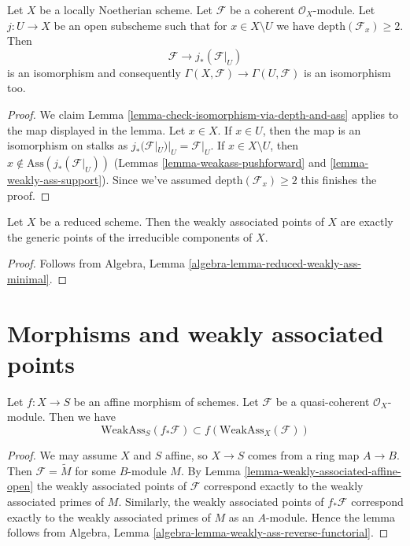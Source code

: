 \begin{lemma}
\label{lemma-depth-2-hartog}
Let $X$ be a locally Noetherian scheme. Let $\mathcal{F}$
be a coherent $\mathcal{O}_X$-module. Let $j : U \to X$
be an open subscheme such that for $x \in X \setminus U$
we have $\text{depth}(\mathcal{F}_x) \geq 2$. Then
$$
\mathcal{F} \longrightarrow j_*(\mathcal{F}|_U)
$$
is an isomorphism and consequently
$\Gamma(X, \mathcal{F}) \to \Gamma(U, \mathcal{F})$
is an isomorphism too.
\end{lemma}

\begin{proof}
We claim Lemma \ref{lemma-check-isomorphism-via-depth-and-ass}
applies to the map displayed in the lemma.
Let $x \in X$. If $x \in U$, then the map is an
isomorphism on stalks as $j_*(\mathcal{F}|_U)|_U = \mathcal{F}|_U$.
If $x \in X \setminus U$, then $x \not \in \text{Ass}(j_*(\mathcal{F}|_U))$
(Lemmas \ref{lemma-weakass-pushforward} and \ref{lemma-weakly-ass-support}).
Since we've assumed $\text{depth}(\mathcal{F}_x) \geq 2$
this finishes the proof.
\end{proof}

\begin{lemma}
\label{lemma-weakass-reduced}
Let $X$ be a reduced scheme. Then the weakly associated points of $X$
are exactly the generic points of the irreducible components of $X$.
\end{lemma}

\begin{proof}
Follows from Algebra, Lemma \ref{algebra-lemma-reduced-weakly-ass-minimal}.
\end{proof}



\section{Morphisms and weakly associated points}
\label{section-morphisms-weakly-associated}

\begin{lemma}
\label{lemma-weakly-ass-reverse-functorial}
Let $f : X \to S$ be an affine morphism of schemes.
Let $\mathcal{F}$ be a quasi-coherent $\mathcal{O}_X$-module.
Then we have
$$
\text{WeakAss}_S(f_*\mathcal{F}) \subset f(\text{WeakAss}_X(\mathcal{F}))
$$
\end{lemma}

\begin{proof}
We may assume $X$ and $S$ affine, so $X \to S$ comes from a ring map
$A \to B$. Then $\mathcal{F} = \widetilde M$ for some $B$-module $M$. By
Lemma \ref{lemma-weakly-associated-affine-open}
the weakly associated points of $\mathcal{F}$ correspond exactly to the
weakly associated primes of $M$. Similarly, the weakly associated points
of $f_*\mathcal{F}$ correspond exactly to the weakly associated primes
of $M$ as an $A$-module. Hence the lemma follows from
Algebra, Lemma \ref{algebra-lemma-weakly-ass-reverse-functorial}.
\end{proof}

